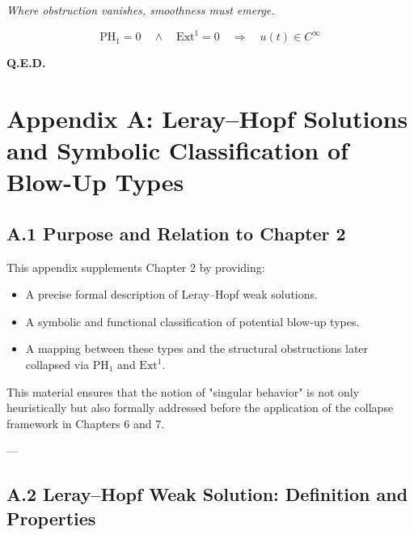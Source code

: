 \documentclass[11pt]{article}
\begin{document}
\begin{center}
\textit{Where obstruction vanishes, smoothness must emerge.}
\end{center}

\[
\boxed{\mathrm{PH}_1 = 0 \quad \land \quad \mathrm{Ext}^1 = 0 \quad \Longrightarrow \quad u(t) \in C^\infty}
\]

\begin{flushright}
\textbf{Q.E.D.}
\end{flushright}



\appendix
\section*{Appendix A: Leray–Hopf Solutions and Symbolic Classification of Blow-Up Types}

\subsection*{A.1 Purpose and Relation to Chapter 2}

This appendix supplements Chapter 2 by providing:

\begin{itemize}
  \item A precise formal description of Leray–Hopf weak solutions.
  \item A symbolic and functional classification of potential blow-up types.
  \item A mapping between these types and the structural obstructions later collapsed via \( \mathrm{PH}_1 \) and \( \mathrm{Ext}^1 \).
\end{itemize}

This material ensures that the notion of "singular behavior" is not only heuristically but also formally addressed before the application of the collapse framework in Chapters 6 and 7.

---

\subsection*{A.2 Leray–Hopf Weak Solution: Definition and Properties}
\end{document}
